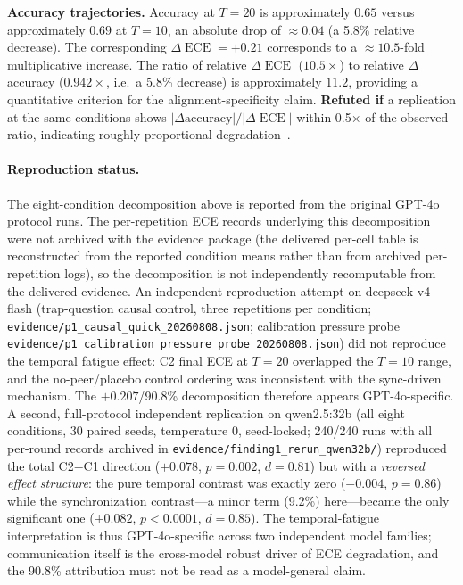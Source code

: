 \documentclass[11pt]{article}
\DeclareMathOperator{\ECE}{ECE}
\begin{document}
\textbf{Accuracy trajectories.} Accuracy at $T{=}20$ is approximately $0.65$ versus approximately $0.69$ at $T{=}10$, an absolute drop of $\approx 0.04$ (a 5.8\% relative decrease). The corresponding $\Delta\ECE = +0.21$ corresponds to a $\approx 10.5$-fold multiplicative increase. The ratio of relative $\Delta\ECE$ ($10.5\times$) to relative $\Delta$accuracy ($0.942\times$, i.e.\ a 5.8\% decrease) is approximately $11.2$, providing a quantitative criterion for the alignment-specificity claim. \textbf{Refuted if} a replication at the same conditions shows $|\Delta\text{accuracy}|/|\Delta\ECE|$ within 0.5$\times$ of the observed ratio, indicating roughly proportional degradation~\citep{dodge2019show}.

\paragraph{Reproduction status.} The eight-condition decomposition above is reported from the original GPT-4o protocol runs. The per-repetition ECE records underlying this decomposition were not archived with the evidence package (the delivered per-cell table is reconstructed from the reported condition means rather than from archived per-repetition logs), so the decomposition is not independently recomputable from the delivered evidence. An independent reproduction attempt on deepseek-v4-flash (trap-question causal control, three repetitions per condition; \texttt{evidence/p1\_causal\_quick\_20260808.json}; calibration pressure probe \texttt{evidence/p1\_calibration\_pressure\_probe\_20260808.json}) did not reproduce the temporal fatigue effect: C2 final ECE at $T{=}20$ overlapped the $T{=}10$ range, and the no-peer/placebo control ordering was inconsistent with the sync-driven mechanism. The $+0.207$/90.8\% decomposition therefore appears GPT-4o-specific. A second, full-protocol independent replication on qwen2.5:32b (all eight conditions, 30 paired seeds, temperature 0, seed-locked; 240/240 runs with all per-round records archived in \texttt{evidence/finding1\_rerun\_qwen32b/}) reproduced the total C2$-$C1 direction ($+0.078$, $p = 0.002$, $d = 0.81$) but with a \emph{reversed effect structure}: the pure temporal contrast was exactly zero ($-0.004$, $p = 0.86$) while the synchronization contrast---a minor term (9.2\%) here---became the only significant one ($+0.082$, $p < 0.0001$, $d = 0.85$). The temporal-fatigue interpretation is thus GPT-4o-specific across two independent model families; communication itself is the cross-model robust driver of ECE degradation, and the 90.8\% attribution must not be read as a model-general claim.
\end{document}
